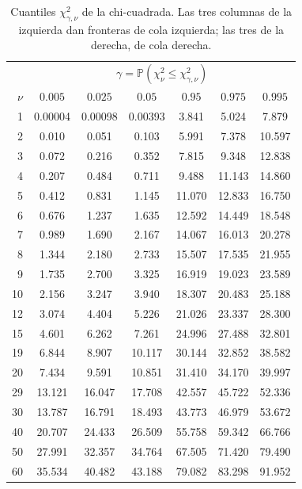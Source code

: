 \documentclass[11pt]{article}
\theoremstyle{plain}
\theoremstyle{definition}
\theoremstyle{remark}
\theoremstyle{solstyle}
\newcommand{\Pbb}{\mathbb{P}}
\newcommand{\1}{\mathbbm{1}}
\begin{document}
\begin{table}[H]
\centering\small
\renewcommand{\arraystretch}{1.08}
\begin{tabular}{r|cccccc}
\toprule
& \multicolumn{6}{c}{$\gamma=\Pbb(\chi^2_\nu\le \chi^2_{\gamma,\nu})$}\\
$\nu$ & $0.005$ & $0.025$ & $0.05$ & $0.95$ & $0.975$ & $0.995$ \\
\midrule
1 & 0.00004 & 0.00098 & 0.00393 & 3.841 & 5.024 & 7.879 \\
2 & 0.010 & 0.051 & 0.103 & 5.991 & 7.378 & 10.597 \\
3 & 0.072 & 0.216 & 0.352 & 7.815 & 9.348 & 12.838 \\
4 & 0.207 & 0.484 & 0.711 & 9.488 & 11.143 & 14.860 \\
5 & 0.412 & 0.831 & 1.145 & 11.070 & 12.833 & 16.750 \\
6 & 0.676 & 1.237 & 1.635 & 12.592 & 14.449 & 18.548 \\
7 & 0.989 & 1.690 & 2.167 & 14.067 & 16.013 & 20.278 \\
8 & 1.344 & 2.180 & 2.733 & 15.507 & 17.535 & 21.955 \\
9 & 1.735 & 2.700 & 3.325 & 16.919 & 19.023 & 23.589 \\
10 & 2.156 & 3.247 & 3.940 & 18.307 & 20.483 & 25.188 \\
12 & 3.074 & 4.404 & 5.226 & 21.026 & 23.337 & 28.300 \\
15 & 4.601 & 6.262 & 7.261 & 24.996 & 27.488 & 32.801 \\
19 & 6.844 & 8.907 & 10.117 & 30.144 & 32.852 & 38.582 \\
20 & 7.434 & 9.591 & 10.851 & 31.410 & 34.170 & 39.997 \\
29 & 13.121 & 16.047 & 17.708 & 42.557 & 45.722 & 52.336 \\
30 & 13.787 & 16.791 & 18.493 & 43.773 & 46.979 & 53.672 \\
40 & 20.707 & 24.433 & 26.509 & 55.758 & 59.342 & 66.766 \\
50 & 27.991 & 32.357 & 34.764 & 67.505 & 71.420 & 79.490 \\
60 & 35.534 & 40.482 & 43.188 & 79.082 & 83.298 & 91.952 \\
\bottomrule
\end{tabular}
\caption{Cuantiles $\chi^2_{\gamma,\nu}$ de la chi-cuadrada. Las tres columnas de la izquierda dan fronteras de cola izquierda; las tres de la derecha, de cola derecha.}
\label{tab:chi2}
\end{table}
\end{document}
